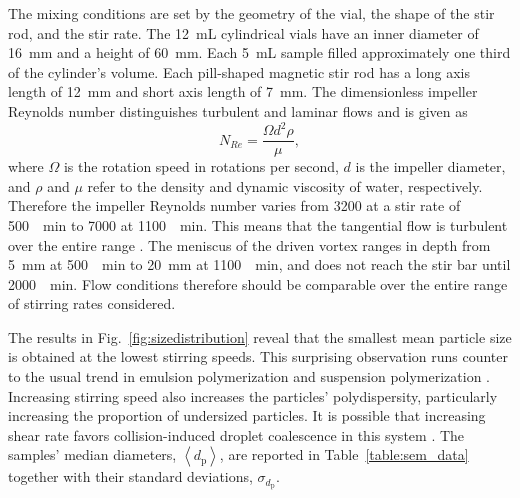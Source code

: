 \documentclass[journal=langd5,manuscript=article]{achemso}
\newcommand{\avg}[1]{\left< #1 \right>}
\begin{document}
The mixing conditions are set by the geometry of the vial, the shape
of the stir rod, and the stir rate. The \SI{12}{\milli\liter}
cylindrical vials 
have an inner diameter of \SI{16}{\milli\meter} and a height of \SI{60}{\milli\meter}.
Each \SI{5}{\milli\liter} sample filled approximately one third of the cylinder's volume.
Each pill-shaped magnetic stir rod has a long axis length of \SI{12}{\milli\meter} 
and short axis length of \SI{7}{\milli\meter}. The dimensionless impeller Reynolds number
distinguishes turbulent and laminar flows and is given as
\begin{equation}
    N_{Re} = \frac{\Omega d^2 \rho}{\mu},
\end{equation}
where $\Omega$ is the rotation speed in rotations per second, 
$d$ is the impeller diameter, and $\rho$ and $\mu$ refer to the
density and dynamic viscosity of water, respectively.
Therefore the impeller Reynolds number varies from
\num{3200} at a stir rate of \SI{500}{\per\minute}
to \num{7000} at \SI{1100}{\per\minute}.
This means that the tangential flow is turbulent over the entire 
range \cite{halasz2007vortex}.
The meniscus of the driven vortex ranges in depth
from \SI{5}{\mm} at \SI{500}{\per\minute}
to \SI{20}{\mm} at \SI{1100}{\per\minute}, and does not reach
the stir bar until \SI{2000}{\per\minute}.
Flow conditions therefore should be comparable over the
entire range of stirring rates considered.

The results in Fig.~\ref{fig:sizedistribution}
reveal that the smallest mean particle size is
obtained at the lowest stirring speeds.
This surprising observation
runs counter to the usual trend \cite{oles1992shear,eggersdorfer2010fragmentation}
in emulsion polymerization
\cite{chern06}
and suspension polymerization
\cite{arshady92}.
Increasing stirring speed also increases the particles'
polydispersity, particularly increasing the proportion of undersized particles.
It is possible that increasing shear rate favors 
collision-induced droplet coalescence in this system
\cite{yeung2003shear}.
The samples' median diameters, $\avg{d_{\text{p}}}$,
are reported in Table~\ref{table:sem_data} together
with their standard deviations, $\sigma_{d_{\text{p}}}$.
\end{document}
